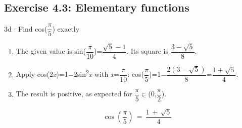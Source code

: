 \documentclass[11pt]{article}
\begin{document}
\begin{keepsection}\subsection{Exercise 4.3: Elementary functions}

\begin{workedbox}{3d \ensuremath{\cdot} Find cos({\small\ensuremath{\dfrac{π}{5}}}) exactly}
\begin{enumerate}
\item The given value is sin({\small\ensuremath{\dfrac{π}{10}}})={\small\ensuremath{\dfrac{\sqrt{5}-1}{4}}}. Its square is {\small\ensuremath{\dfrac{3-\sqrt{5}}{8}}}.
\item Apply cos(2\textit{x})=1\ensuremath{-}2sin\textsuperscript{2}\textit{x} with \textit{x}={\small\ensuremath{\dfrac{π}{10}}}: cos({\small\ensuremath{\dfrac{π}{5}}})=1\ensuremath{-}{\small\ensuremath{\dfrac{2(3-\sqrt{5})}{8}}}={\small\ensuremath{\dfrac{1+\sqrt{5}}{4}}}.
\item {}
The result is positive, as expected for {\small\ensuremath{\dfrac{π}{5}}}\ensuremath{\in}(0,{\small\ensuremath{\dfrac{π}{2}}}).

\begin{equation*}\cos \left(\dfrac{π}{5}\right)\, =\, \dfrac{1\, +\, \sqrt{5}}{4}\end{equation*}
\end{enumerate}
\end{workedbox}

\end{keepsection}
\end{document}
